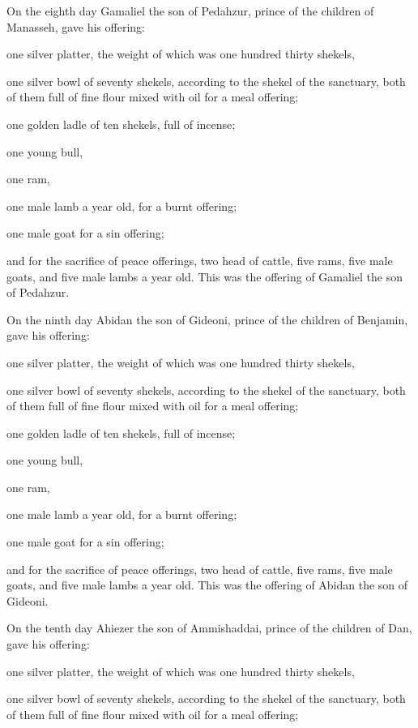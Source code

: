  On the eighth day Gamaliel the son of Pedahzur, prince of
the children of Manasseh,  gave his offering:

one silver platter, the weight of which was one hundred thirty shekels,

one silver bowl of seventy shekels, according to the shekel of the
sanctuary, both of them full of fine flour mixed with oil for a meal
offering;

 one golden ladle of ten shekels, full of incense;

 one young bull,

one ram,

one male lamb a year old, for a burnt offering;

 one male goat for a sin offering;

 and for the sacrifice of peace offerings, two head of
cattle, five rams, five male goats, and five male lambs a year old. This
was the offering of Gamaliel the son of Pedahzur.

 On the ninth day Abidan the son of Gideoni, prince of the
children of Benjamin,  gave his offering:

one silver platter, the weight of which was one hundred thirty shekels,

one silver bowl of seventy shekels, according to the shekel of the
sanctuary, both of them full of fine flour mixed with oil for a meal
offering;

 one golden ladle of ten shekels, full of incense;

 one young bull,

one ram,

one male lamb a year old, for a burnt offering;

 one male goat for a sin offering;

 and for the sacrifice of peace offerings, two head of
cattle, five rams, five male goats, and five male lambs a year old. This
was the offering of Abidan the son of Gideoni.

 On the tenth day Ahiezer the son of Ammishaddai, prince of
the children of Dan,  gave his offering:

one silver platter, the weight of which was one hundred thirty shekels,

one silver bowl of seventy shekels, according to the shekel of the
sanctuary, both of them full of fine flour mixed with oil for a meal
offering;

